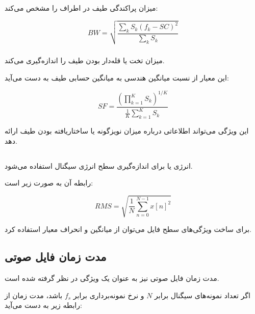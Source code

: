 میزان پراکندگی طیف در اطراف
را مشخص می‌کند:

\begin{equation}
BW
=
\sqrt{
\frac{
\sum_k
S_k(f_k-SC)^2
}{
\sum_kS_k
}
}
\end{equation}


\subsubsection{}

میزان تخت یا قله‌دار بودن طیف را اندازه‌گیری می‌کند.

این معیار از نسبت میانگین هندسی به میانگین حسابی طیف به دست می‌آید:

\begin{equation}
SF
=
\frac{
\left(
\prod_{k=1}^{K}S_k
\right)^{1/K}
}{
\frac{1}{K}
\sum_{k=1}^{K}S_k
}
\end{equation}

این ویژگی می‌تواند اطلاعاتی درباره میزان نویزگونه یا ساختاریافته بودن طیف ارائه دهد.


\subsection{}

انرژی
یا
برای اندازه‌گیری سطح انرژی سیگنال استفاده می‌شود.

رابطه آن به صورت زیر است:

\begin{equation}
RMS
=
\sqrt{
\frac{1}{N}
\sum_{n=0}^{N-1}
x[n]^2
}
\end{equation}

برای ساخت ویژگی‌های سطح فایل می‌توان از میانگین و انحراف معیار
استفاده کرد.


\subsection{مدت زمان فایل صوتی}

مدت زمان فایل صوتی نیز به عنوان یک ویژگی در نظر گرفته شده است.

اگر تعداد نمونه‌های سیگنال برابر $N$ و نرخ نمونه‌برداری برابر $f_s$ باشد، مدت زمان از رابطه زیر به دست می‌آید:

